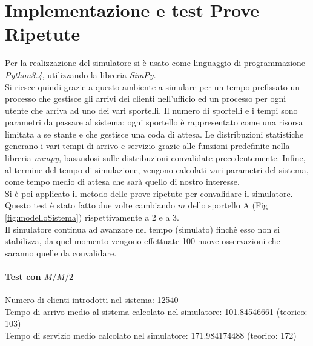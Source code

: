 \documentclass{article}
\begin{document}
\section{Implementazione e test Prove Ripetute}
Per la realizzazione del simulatore si è usato come linguaggio di programmazione \textit{Python3.4}, utilizzando la libreria \textit{SimPy}.\\
Si riesce quindi grazie a questo ambiente a simulare per un tempo prefissato un processo che gestisce gli arrivi dei clienti nell'ufficio ed un processo per ogni utente che arriva ad uno dei vari sportelli. Il numero di sportelli e i tempi sono parametri da passare al sistema: ogni sportello è rappresentato come una risorsa limitata a se stante e che gestisce una coda di attesa. Le distribuzioni statistiche generano i vari tempi di arrivo e servizio grazie alle funzioni predefinite nella libreria \textit{numpy}, basandosi sulle distribuzioni convalidate precedentemente. Infine, al termine del tempo di simulazione, vengono calcolati vari parametri del sistema, come tempo medio di attesa che sarà quello di nostro interesse.\\

Si è poi applicato il metodo delle prove ripetute per convalidare il simulatore.\\
Questo test è stato fatto due volte cambiando $m$ dello sportello A (Fig \ref{fig:modelloSistema}) rispettivamente a 2 e a 3.\\
Il simulatore continua ad avanzare nel tempo (simulato) finchè esso non si stabilizza, da quel momento vengono effettuate 100 nuove osservazioni che saranno quelle da convalidare.

\paragraph{Test con $M/M/2$}
Numero di clienti introdotti nel sistema: 12540\\
Tempo di arrivo medio al sistema calcolato nel simulatore: 101.84546661 (teorico: 103)\\
Tempo di servizio medio calcolato nel simulatore: 171.984174488 (teorico: 172)\\
\end{document}

